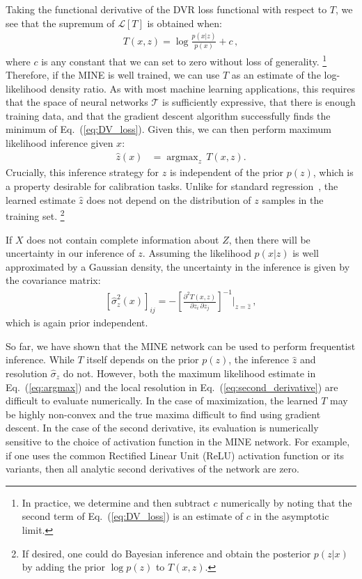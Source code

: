 \documentclass[prl,twocolumn,superscriptaddress,longbibliography,preprintnumbers,floatfix,nofootinbib]{revtex4-1}
\DeclareMathOperator*{\argmax}{argmax}
\DeclareRobustCommand{\Eq}[1]{Eq.~(\ref{eq:#1})}
\begin{document}
Taking the functional derivative of the DVR loss functional with respect to $T$, we see that the supremum of $\mathcal{L}[T]$ is obtained when:
%
\begin{align}
    \label{eq:T_result}
    T(x,z) =  \log\frac{p(x|z)}{p(x)} + c\,,
\end{align}
%
where $c$ is any constant that we can set to zero without loss of generality.%
%
\footnote{In practice, we determine and then subtract $c$ numerically by noting that the second term of \Eq{DV_loss} is an estimate of $c$ in the asymptotic limit.}
%
Therefore, if the MINE is well trained, we can use $T$ as an estimate of the log-likelihood density ratio.
%
As with most machine learning applications, this requires that the space of neural networks $\mathcal{T}$ is sufficiently expressive, that there is enough training data, and that the gradient descent algorithm successfully finds the minimum of \Eq{DV_loss}.
%
Given this, we can then perform maximum likelihood inference given $x$:
\begin{align}
    \hat{z}(x) &= \argmax_{z}\,T(x,z). \label{eq:argmax}
\end{align}
%
Crucially, this inference strategy for $z$ is independent of the prior $p(z)$, which is a property desirable for calibration tasks.
%
Unlike for standard regression~\cite{priordependence}, the learned estimate $\hat{z}$ does not depend on the distribution of $z$ samples in the training set.%
%
\footnote{If desired, one could do Bayesian inference and obtain the posterior $p(z|x)$ by adding the prior $\log p(z)$ to $T(x,z)$.}


If $X$ does not contain complete information about $Z$, then there will be uncertainty in our inference of $z$.
%
Assuming the likelihood $p(x|z)$ is well approximated by a Gaussian density, the uncertainty in the inference is given by the covariance matrix:
%
\begin{align}
    \left[\hat{\sigma}_{z}^2(x)\right]_{ij} = - \left[ \frac{\partial^2 T(x,z)}{\partial z_i \, \partial z_j}  \right]^{-1}\biggr\rvert_{z=\hat{z} }\,, \label{eq:second_derivative}
\end{align}
%
which is again prior independent.


So far, we have shown that the MINE network can be used to perform frequentist inference. While $T$ itself depends on the prior $p(z)$, the inference $\hat{z}$ and resolution $\hat{\sigma}_z$ do not.
%
However, both the maximum likelihood estimate in \Eq{argmax} and the local resolution in \Eq{second_derivative} are difficult to evaluate numerically.
%
In the case of maximization, the learned $T$ may be highly non-convex and the true maxima difficult to find using gradient descent.
%
In the case of the second derivative, its evaluation is numerically sensitive to the choice of activation function in the MINE network.
%
For example, if one uses the common Rectified Linear Unit (ReLU) activation function or its variants, then all analytic second derivatives of the network are zero. 
\end{document}
